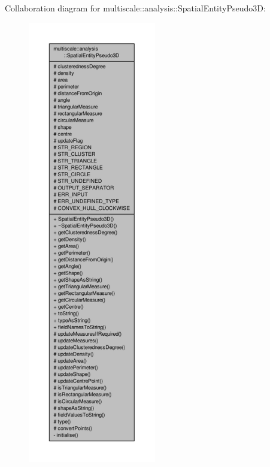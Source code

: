 \-Collaboration diagram for multiscale\-:\-:analysis\-:\-:\-Spatial\-Entity\-Pseudo3\-D\-:
\nopagebreak
\begin{figure}[H]
\begin{center}
\leavevmode
\includegraphics[height=550pt]{classmultiscale_1_1analysis_1_1SpatialEntityPseudo3D__coll__graph}
\end{center}
\end{figure}
